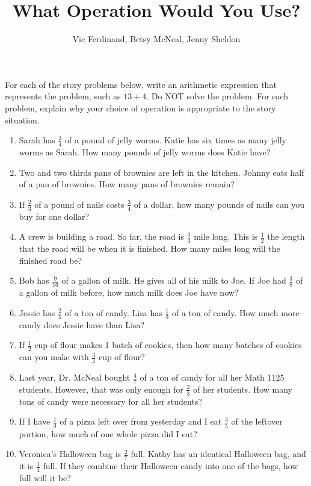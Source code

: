 \documentclass{ximera}
\title{What Operation Would You Use?}
\author{Vic Ferdinand, Betsy McNeal, Jenny Sheldon}
\begin{document}
\begin{abstract} \end{abstract}
\maketitle


\begin{problem}
For each of the story problems below, write an arithmetic expression that represents the problem, such as $13+4$.  Do NOT solve the problem.  For each problem, explain why your choice of operation is appropriate to the story situation.

\vskip 0.1in

\begin{enumerate}\itemsep0.7in

	\item Sarah has $\frac34$ of a pound of jelly worms.  Katie has six times as many jelly worms as Sarah.  How many pounds of jelly worms does Katie have?
	
	\item Two and two thirds pans of brownies are left in the kitchen.  Johnny eats half of a pan of brownies.  How many pans of brownies remain?

	\item  If $\frac23$ of a pound of nails costs $\frac34$ of a dollar,  how many pounds of nails can you buy for one dollar?

	\item  A crew is building a road.  So far, the road is $\frac34$ mile long.  This is $\frac12$ the length that the road will be when it is finished.  How many miles long will the finished road be?

	\item  Bob has $\frac{9}{16}$ of a gallon of milk.  He gives all of his milk to Joe.  If Joe had $\frac38$ of a gallon of milk before, how much milk does Joe have now?
	
	\item Jessie has $\frac25$ of a ton of candy.  Lisa has $\frac13$ of a ton of candy.  How much more candy does Jessie have than Lisa?

	\item If $\frac12$ cup of flour makes 1 batch of cookies, then how many batches of cookies can you make with $\frac34$ cup of flour?
	
	\item Last year, Dr. McNeal bought $\frac47$ of a ton of candy for all her Math 1125 students.  However, that was only enough for $\frac23$ of her students.  How many tons of candy were necessary for all her students?

	\item  If I have $\frac13$ of a pizza left over from yesterday and I eat $\frac35$ of the leftover portion, how much of one whole pizza did I eat?
		
	\item Veronica's Halloween bag is $\frac27$ full.  Kathy has an identical Halloween bag, and it is $\frac14$ full.  If they combine their Halloween candy into one of the bags, how full will it be?

\end{enumerate}
\end{problem}
\end{document}
